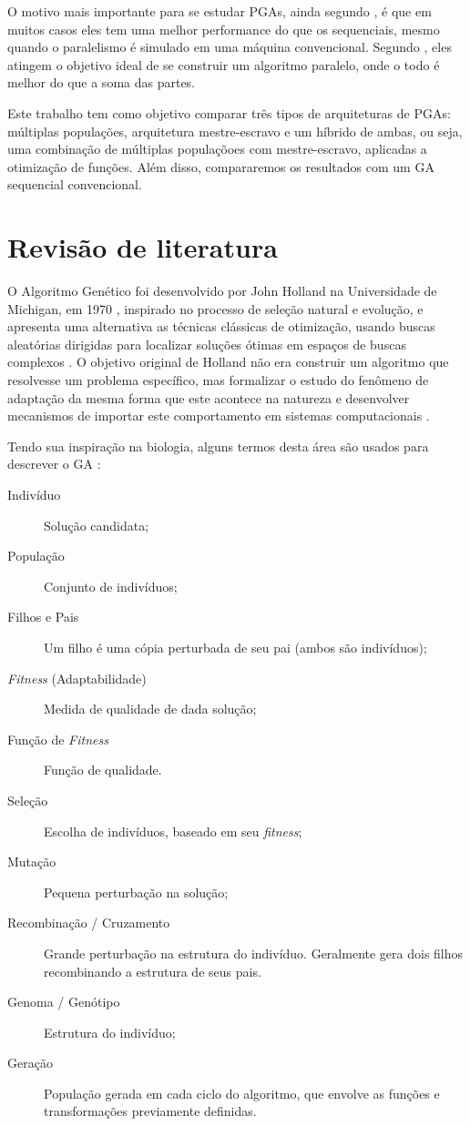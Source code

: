 \documentclass[12pt]{article}
\begin{document}
O motivo mais importante para se estudar PGAs, ainda segundo \cite{paraleltax}, é que em muitos casos eles tem uma melhor performance do que os sequenciais, mesmo quando o paralelismo é simulado em uma máquina convencional. Segundo \cite{albasurvey}, eles atingem o objetivo ideal de se construir um algoritmo paralelo, onde o todo é melhor do que a soma das partes.

Este trabalho tem como objetivo comparar três tipos de arquiteturas de PGAs: múltiplas populações, arquitetura mestre-escravo e um híbrido de ambas, ou seja, uma combinação de múltiplas populaçõoes com mestre-escravo, aplicadas a otimização de funções. Além disso, compararemos os resultados com um GA sequencial convencional.

\section{Revisão de literatura} %
\label{sec:revisao_bibliogragica}


O Algoritmo Genético foi desenvolvido por John Holland na Universidade de Michigan, em 1970 \cite{holland1975}, inspirado no processo de seleção natural e evolução, e apresenta uma alternativa as técnicas clássicas de otimização, usando buscas aleatórias dirigidas para localizar soluções ótimas em espaços de buscas complexos \cite{gasurvey}. O objetivo original de Holland não era construir um algoritmo que resolvesse um problema específico, mas formalizar o estudo do fenômeno de adaptação da mesma forma que este acontece na natureza e desenvolver mecanismos de importar este comportamento em sistemas computacionais \cite{geintro1998}.

Tendo sua inspiração na biologia, alguns termos desta área são usados para descrever o GA \cite{luke2009}:
\begin{description}
	\item [Indivíduo] Solução candidata;
	\item [População] Conjunto de indivíduos;
	\item [Filhos e Pais] Um filho é uma cópia perturbada de seu pai (ambos são indivíduos);
	\item [\emph{Fitness} (Adaptabilidade)] Medida de qualidade de dada solução; 
	\item [Função de \emph{Fitness}] Função de qualidade. 
  \item [Seleção] Escolha de indivíduos, baseado em seu \emph{fitness};
  \item [Mutação] Pequena perturbação na solução;
  \item [Recombinação / Cruzamento] Grande perturbação na estrutura do indivíduo. Geralmente gera dois filhos recombinando a estrutura de seus pais.
  \item [Genoma / Genótipo] Estrutura do indivíduo;
  \item [Geração] População gerada em cada ciclo do algoritmo, que envolve as funções e transformações previamente definidas.
 \end{description}
\end{document}
